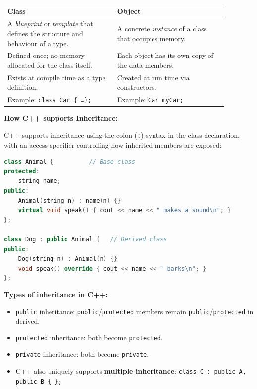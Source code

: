 \documentclass[12pt,a3paper]{article}
\begin{document}
\begin{enumerate}
\begin{tcolorbox}[enhanced,breakable,ansbox,colback=cA!4,colframe=cA,
  boxrule=0.8pt,arc=5pt,
  title={\textbf{Answer}},fonttitle=\bfseries\color{white},colbacktitle=cA]
\begin{center}
\small
\begin{tabular}{@{}p{0.44\linewidth}p{0.44\linewidth}@{}}
\toprule
\textbf{Class} & \textbf{Object} \\
\midrule
A \emph{blueprint} or \emph{template} that defines the structure and
behaviour of a type. &
A concrete \emph{instance} of a class that occupies memory. \\[3pt]
Defined once; no memory allocated for the class itself. &
Each object has its own copy of the data members. \\[3pt]
Exists at compile time as a type definition. &
Created at run time via constructors. \\[3pt]
Example: \texttt{class Car \{ \ldots \};} &
Example: \texttt{Car myCar;} \\
\bottomrule
\end{tabular}
\end{center}

\medskip
\textbf{How C++ supports Inheritance:}

C++ supports inheritance using the colon (\texttt{:}) syntax in the
class declaration, with an access specifier controlling how inherited
members are exposed:

\begin{lstlisting}[language=C++]
class Animal {          // Base class
protected:
    string name;
public:
    Animal(string n) : name(n) {}
    virtual void speak() { cout << name << " makes a sound\n"; }
};

class Dog : public Animal {   // Derived class
public:
    Dog(string n) : Animal(n) {}
    void speak() override { cout << name << " barks\n"; }
};
\end{lstlisting}

\textbf{Types of inheritance in C++:}
\begin{itemize}[itemsep=1pt]
  \item \texttt{public} inheritance: \texttt{public}/\texttt{protected}
    members remain \texttt{public}/\texttt{protected} in derived.
  \item \texttt{protected} inheritance: both become \texttt{protected}.
  \item \texttt{private} inheritance: both become \texttt{private}.
  \item C++ also uniquely supports \textbf{multiple inheritance}:
    \texttt{class C : public A, public B \{ \};}
\end{itemize}


\end{tcolorbox}
\end{enumerate}
\end{document}
